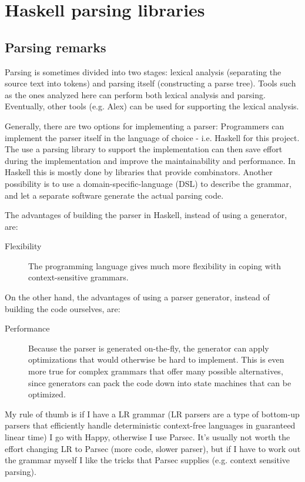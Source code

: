 
\section{Haskell parsing libraries}
\label{sec:libraries}

\subsection{Parsing remarks}
Parsing is sometimes divided into two stages: lexical analysis (separating the source text into tokens) and parsing itself (constructing a parse tree).
Tools such as the ones analyzed here can perform both lexical analysis and parsing.
Eventually, other tools (e.g. Alex) can be used for supporting the lexical analysis.

Generally, there are two options for implementing a parser:
Programmers can implement the parser itself in the language of choice - i.e. Haskell for this project.
The use a parsing library to support the implementation can then save effort during the implementation and improve the maintainability and performance.
In Haskell this is mostly done by libraries that provide combinators. %
Another possibility is to use a domain-specific-language (DSL) to describe the grammar, and let a separate software generate the actual parsing code.

The advantages of building the parser in Haskell, instead of using a generator, are:
\begin{description}
	\item[Flexibility] The programming language gives much more flexibility in coping with context-sensitive grammars.
\end{description}
%
On the other hand, the advantages of using a parser generator, instead of building the code ourselves, are:
\begin{description}
	\item[Performance] Because the parser is generated on-the-fly, the generator can apply optimizations that would otherwise be hard to implement.
		This is even more true for complex grammars that offer many possible alternatives, since generators can pack the code down into state machines that can be optimized.
\end{description}

My rule of thumb is if I have a LR grammar (LR parsers are a type of bottom-up parsers that efficiently handle deterministic context-free languages in guaranteed linear time) I go with Happy, otherwise I use Parsec. It's usually not worth the effort changing LR to Parsec (more code, slower parser), but if I have to work out the grammar myself I like the tricks that Parsec supplies (e.g. context sensitive parsing).

